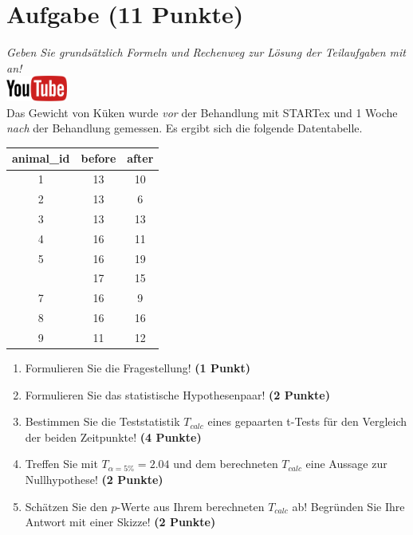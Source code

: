 \documentclass[a4paper, 10pt]{scrartcl}\usepackage[]{graphicx}\usepackage[]{xcolor}
\begin{document}
\section{Aufgabe \hfill (11 Punkte)}

\textit{Geben Sie grunds{\"a}tzlich Formeln und Rechenweg zur L{\"o}sung der
  Teilaufgaben mit an!} \\[1Ex]

\hfill\href{https://youtu.be/QR90zyn0Iz8}{\includegraphics[width =
  2cm]{img/youtube}}\\[1Ex]


Das Gewicht von K{\"u}ken wurde \textit{vor} der Behandlung mit STARTex und 1
Woche \textit{nach} der Behandlung gemessen. Es ergibt sich die folgende
Datentabelle.

\begin{table}[!h]
\centering
\begin{tabular}{ccc}
\toprule
animal\_id & before & after\\
\midrule
1 & 13 & 10\\
2 & 13 & 6\\
3 & 13 & 13\\
4 & 16 & 11\\
5 & 16 & 19\\
\addlinespace
6 & 17 & 15\\
7 & 16 & 9\\
8 & 16 & 16\\
9 & 11 & 12\\
\bottomrule
\end{tabular}
\end{table}



\begin{enumerate}
\item Formulieren Sie die Fragestellung! \textbf{(1 Punkt)}
\item Formulieren Sie das statistische Hypothesenpaar! \textbf{(2
    Punkte)}
\item Bestimmen Sie die Teststatistik $T_{calc}$ eines gepaarten t-Tests f{\"u}r den
  Vergleich der beiden Zeitpunkte! \textbf{(4 Punkte)}
\item Treffen Sie mit $T_{\alpha = 5\%} = 2.04$ und dem berechneten $T_{calc}$ eine Aussage
  zur Nullhypothese! \textbf{(2 Punkte)}
\item Sch{\"a}tzen Sie den $p$-Werte aus Ihrem berechneten $T_{calc}$ ab!
  Begr{\"u}nden Sie Ihre Antwort mit einer Skizze! \textbf{(2
    Punkte)}
\end{enumerate} 
\clearpage
\end{document}
